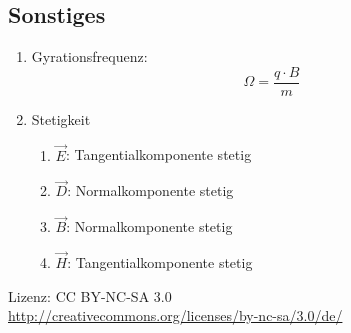 \documentclass[a4paper,twocolumn,10pt]{article}
\begin{document}
\subsection{Sonstiges}
\begin{enumerate}[label=$\bullet$]
\item Gyrationsfrequenz:
\begin{equation*}
\Omega =\frac{q\cdot B}{m}
\end{equation*}
\item Stetigkeit
\begin{enumerate}[label=]
\item $\overrightarrow{E}$: Tangentialkomponente stetig
\item $\overrightarrow{D}$: Normalkomponente stetig
\item $\overrightarrow{B}$: Normalkomponente stetig
\item $\overrightarrow{H}$: Tangentialkomponente stetig
\end{enumerate}
\end{enumerate}
Lizenz: CC BY-NC-SA 3.0\\
\url{http://creativecommons.org/licenses/by-nc-sa/3.0/de/}
\end{document}
